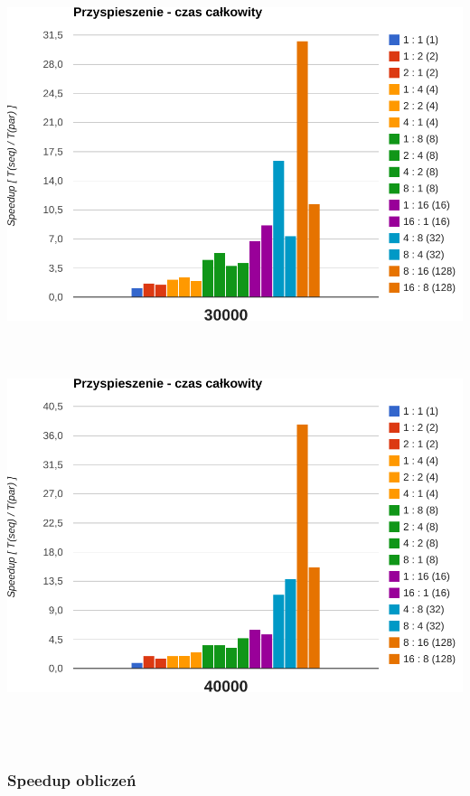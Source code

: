 \documentclass[paper=a4, fontsize=11pt]{scrartcl}	%
\numberwithin{equation}{section}		%
\numberwithin{figure}{section}			%
\numberwithin{table}{section}				%
\begin{document}
\begin{center}
\includegraphics[width=135mm]{report/speedup-30000.pdf} \\ \ \\ \ \\ \ \\

\includegraphics[width=135mm]{report/speedup-40000.pdf} \\ \ \\ \ \\ \ \\

\end{center}


\subsubsection{Speedup obliczeń}
\end{document}
